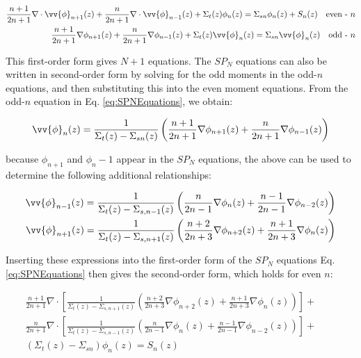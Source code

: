 \documentclass[10pt]{article}
\begin{document}
\begin{flushleft}
\begin{equation}
\label{eq:SPNEquations}
\begin{aligned}
\frac{n+1}{2n+1}\nabla\cdot\vv{\phi}_{n+1}(z)+\frac{n}{2n+1}\nabla\cdot\vv{\phi}_{n-1}(z)+ \Sigma_t(z)\phi_n(z)=\Sigma_{sn}\phi_n(z)+ S_n(z)\quad \textrm{even - } n\\
\frac{n+1}{2n+1}\nabla\phi_{n+1}(z)+\frac{n}{2n+1}\nabla\phi_{n-1}(z)+ \Sigma_t(z)\vv{\phi}_n(z)=\Sigma_{sn}\vv{\phi}_n(z)\quad \textrm{odd - } n\\
\end{aligned}
 \end{equation}

This first-order form gives \(N+1\) equations. The \(SP_N\) equations can also be written in second-order form by solving for the odd moments in the odd-\(n\) equations, and then substituting this into the even moment equations. From the odd-\(n\) equation in Eq. \eqref{eq:SPNEquations}, we obtain:

\begin{equation}
\vv{\phi}_n(z)=\frac{1}{\Sigma_t(z)-\Sigma_{sn}(z)}\left(\frac{n+1}{2n+1}\nabla\phi_{n+1}(z)+\frac{n}{2n+1}\nabla\phi_{n-1}(z)\right)
\end{equation}

because \(\phi_{n+1}\) and \(\phi_n-1\) appear in the \(SP_N\) equations, the above can be used to determine the following additional relationships:

\begin{equation}
\begin{aligned}
\vv{\phi}_{n-1}(z)=\frac{1}{\Sigma_t(z)-\Sigma_{s,n-1}(z)}\left(\frac{n}{2n-1}\nabla\phi_{n}(z)+\frac{n-1}{2n-1}\nabla\phi_{n-2}(z)\right)\\
\vv{\phi}_{n+1}(z)=\frac{1}{\Sigma_t(z)-\Sigma_{s,n+1}(z)}\left(\frac{n+2}{2n+3}\nabla\phi_{n+2}(z)+\frac{n+1}{2n+3}\nabla\phi_{n}(z)\right)\\
\end{aligned}
\end{equation}

Inserting these expressions into the first-order form of the \(SP_N\) equations Eq. \eqref{eq:SPNEquations} then gives the second-order form, which holds for even \(n\):

\begin{equation}
\label{eq:SPNEquations}
\begin{aligned}
\frac{n+1}{2n+1}\nabla\cdot\left\lbrack\frac{1}{\Sigma_t(z)-\Sigma_{s,n+1}(z)}\left(\frac{n+2}{2n+3}\nabla\phi_{n+2}(z)+\frac{n+1}{2n+3}\nabla\phi_{n}(z)\right)\right\rbrack+\quad\quad\\
\frac{n}{2n+1}\nabla\cdot\left\lbrack\frac{1}{\Sigma_t(z)-\Sigma_{s,n-1}(z)}\left(\frac{n}{2n-1}\nabla\phi_{n}(z)+\frac{n-1}{2n-1}\nabla\phi_{n-2}(z)\right)\right\rbrack+\quad\quad\\
 (\Sigma_t(z)-\Sigma_{sn})\phi_n(z)= S_n(z)\\
\end{aligned}
 \end{equation}


\end{flushleft}
\end{document}
